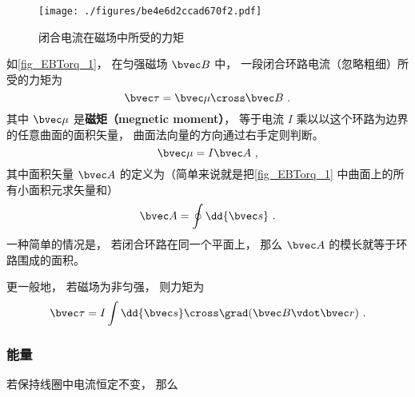 
\begin{figure}[ht]
\centering
\texttt{[image: ./figures/be4e6d2ccad670f2.pdf]}
\caption{闭合电流在磁场中所受的力矩} \label{fig_EBTorq_1}
\end{figure}

如\autoref{fig_EBTorq_1}， 在匀强磁场 $\bvec B$ 中， 一段闭合环路电流（忽略粗细）所受的力矩为
\begin{equation}\label{eq_EBTorq_2}
\bvec \tau = \bvec \mu \cross \bvec B~.
\end{equation}
其中 $\bvec \mu$ 是\textbf{磁矩（megnetic moment）}， 等于电流 $I$ 乘以以这个环路为边界的任意曲面的面积矢量， 曲面法向量的方向通过右手定则判断。
\begin{equation}
\bvec \mu = I \bvec A~,
\end{equation}
其中面积矢量 $\bvec A$ 的定义为（简单来说就是把\autoref{fig_EBTorq_1} 中曲面上的所有小面积元求矢量和）
\begin{equation}
\bvec A = \oint \dd{\bvec s}~.
\end{equation}
一种简单的情况是， 若闭合环路在同一个平面上， 那么 $\bvec A$ 的模长就等于环路围成的面积。

更一般地， 若磁场为非匀强， 则力矩为
\begin{equation}\label{eq_EBTorq_1}
\bvec \tau = I \int \dd{\bvec s}\cross\grad(\bvec B\vdot\bvec r)~.
\end{equation}

\subsubsection{能量}
若保持线圈中电流恒定不变， 那么

